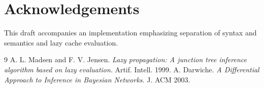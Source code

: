 \documentclass[11pt]{article}
\begin{document}
\section*{Acknowledgements}
This draft accompanies an implementation emphasizing separation of syntax and semantics and lazy cache evaluation.

\begin{thebibliography}{9}
 A. L. Madsen and F. V. Jensen. \textit{Lazy propagation: A junction tree inference algorithm based on lazy evaluation}. Artif. Intell. 1999.
 A. Darwiche. \textit{A Differential Approach to Inference in Bayesian Networks}. J. ACM 2003.
\end{thebibliography}
\end{document}
